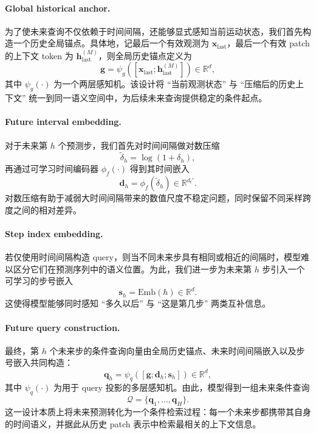 \paragraph{Global historical anchor.}
为了使未来查询不仅依赖于时间间隔，还能够显式感知当前运动状态，我们首先构造一个历史全局锚点。具体地，记最后一个有效观测为 $\bm{x}_{\mathrm{last}}$，最后一个有效 patch 的上下文 token 为 $\bm{h}_{\mathrm{last}}^{(M)}$，则全局历史锚点定义为
\begin{equation}
\bm{g} = \psi_g([\bm{x}_{\mathrm{last}}; \bm{h}_{\mathrm{last}}^{(M)}]) \in \mathbb{R}^{d},
\end{equation}
其中 $\psi_g(\cdot)$ 为一个两层感知机。该设计将 ``当前观测状态'' 与 ``压缩后的历史上下文'' 统一到同一语义空间中，为后续未来查询提供稳定的条件起点。

\paragraph{Future interval embedding.}
对于未来第 $h$ 个预测步，我们首先对时间间隔做对数压缩
\begin{equation}
\tilde{\delta}_h = \log(1 + \delta_h),
\end{equation}
再通过可学习时间编码器 $\phi_f(\cdot)$ 得到其时间嵌入
\begin{equation}
\bm{d}_h = \phi_f(\tilde{\delta}_h) \in \mathbb{R}^{d_t'}.
\end{equation}
对数压缩有助于减弱大时间间隔带来的数值尺度不稳定问题，同时保留不同采样跨度之间的相对差异。

\paragraph{Step index embedding.}
若仅使用时间间隔构造 query，则当不同未来步具有相同或相近的间隔时，模型难以区分它们在预测序列中的语义位置。为此，我们进一步为未来第 $h$ 步引入一个可学习的步号嵌入
\begin{equation}
\bm{s}_h = \mathrm{Emb}(h) \in \mathbb{R}^{d}.
\end{equation}
这使得模型能够同时感知 ``多久以后'' 与 ``这是第几步'' 两类互补信息。

\paragraph{Future query construction.}
最终，第 $h$ 个未来步的条件查询向量由全局历史锚点、未来时间间隔嵌入以及步号嵌入共同构造：
\begin{equation}
\bm{q}_h = \psi_q([\bm{g}; \bm{d}_h; \bm{s}_h]) \in \mathbb{R}^{d},
\end{equation}
其中 $\psi_q(\cdot)$ 为用于 query 投影的多层感知机。由此，模型得到一组未来条件查询
\begin{equation}
\mathcal{Q} = \{\bm{q}_1, \dots, \bm{q}_H\}.
\end{equation}
这一设计本质上将未来预测转化为一个条件检索过程：每一个未来步都携带其自身的时间语义，并据此从历史 patch 表示中检索最相关的上下文信息。

